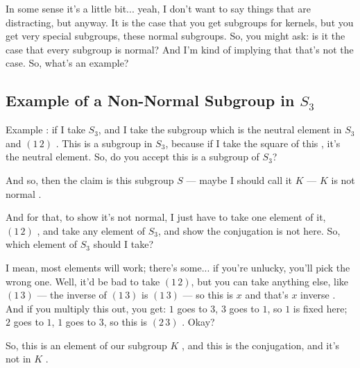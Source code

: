 \begin{hidden}
\end{hidden}

\begin{speech}[00:50:37 - 00:51:01]
In some sense it's a little bit... yeah, I don't want to say things that are distracting, but anyway. It is the case that you get subgroups for kernels, but you get very special subgroups, these normal subgroups. So, you might ask: is it the case that every subgroup is normal? And I'm kind of implying that that's not the case. So, what's an example?
\end{speech}

\subsection{Example of a Non-Normal Subgroup in \texorpdfstring{$S_3$}{S\_3}}

\begin{speech}[00:51:01 - 00:52:43]
Example : if I take $S_3$, and I take the subgroup which is the neutral element in $S_3$ and $(1\,2)$ . This is a subgroup in $S_3$, because if I take the square of this , it's the neutral element. So, do you accept this is a subgroup of $S_3$?

And so, then the claim is this subgroup $S$ --- maybe I should call it $K$  --- $K$ is not normal .

And for that, to show it's not normal, I just have to take one element of it, $(1\,2)$ , and take any element of $S_3$, and show the conjugation is not here. So, which element of $S_3$ should I take? 

I mean, most elements will work; there's some... if you're unlucky, you'll pick the wrong one. Well, it'd be bad to take $(1\,2)$, but you can take anything else, like $(1\,3)$ --- the inverse of $(1\,3)$ is $(1\,3)$  --- so this is $x$  and that's $x$ inverse . And if you multiply this out, you get: $1$ goes to $3$, $3$ goes to $1$, so $1$ is fixed here; $2$ goes to $1$, $1$ goes to $3$, so this is $(2\,3)$ . Okay?

So, this is an element of our subgroup $K$ , and this is the conjugation, and it's not in $K$ .
\end{speech}

